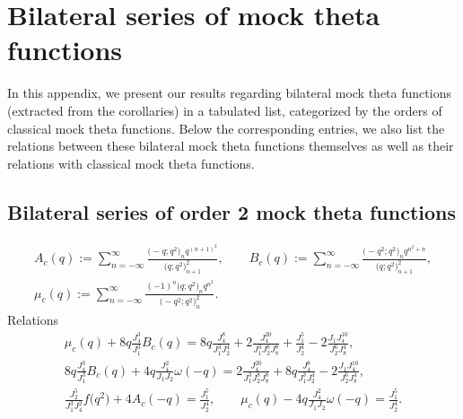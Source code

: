 \documentclass[10pt,a4paper]{amsart}
\numberwithin{equation}{section}
\begin{document}
\section{Bilateral series of mock theta functions}\label{appendixB}

In this appendix, we present our results regarding bilateral mock theta functions (extracted from the corollaries) in a tabulated list, categorized by the orders of classical mock theta functions. Below the corresponding entries, we also list the relations between these bilateral mock theta functions themselves as well as their relations with classical mock theta functions.
\subsection{Bilateral series of order 2 mock theta functions}
\begin{gather*}
A_c(q):=\sum_{n=-\infty}^{\infty}\frac{\bigl(-q;q^2\bigr)_n q^{(n+1)^2}}{\bigl(q;q^2\bigr)_{n+1}^2},\qquad
B_c(q):=\sum_{n=-\infty}^{\infty}\frac{\bigl(-q^2;q^2\bigr)_n q^{n^2+n}}{\bigl(q;q^2\bigr)_{n+1}^2},\\
\mu_c(q):=\sum_{n=-\infty}^{\infty}\frac{(-1)^n\bigl(q;q^2\bigr)_nq^{n^2}}{\bigl(-q^2;q^2\bigr)_n^2}.
\end{gather*}
Relations
\begin{gather*}
\mu_c(q)+8q\frac{J_4^3}{J_1^3}B_c(q)=8q\frac{J_4^8}{J_1^3J_2^4}
+2\frac{J_4^{20}}{J_1^3J_2^8J_8^8}+\frac{J_1^5}{J_2^4}
-2\frac{J_1J_4^{10}}{J_2^6J_8^4},\\
8q\frac{J_4^3}{J_1^3}B_c(q)+4q\frac{J_4^2}{J_1J_2}\omega(-q)=2\frac{J_4^{20}}{J_1^3J_2^8J_8^8}
+8q\frac{J_4^8}{J_1^3J_2^4}-2\frac{J_1J_4^{10}}{J_2^6J_8^4},\\
\frac{J_2^5}{J_1^3J_4^2}f\bigl(q^2\bigr)+4A_c(-q)=\frac{J_1^5}{J_2^4},\qquad\mu_c(q)-4q\frac{J_4^2}{J_1J_2}\omega(-q)=\frac{J_1^5}{J_2^4}.
\end{gather*}
\end{document}
